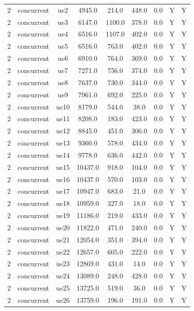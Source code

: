 \begin{table}[ht]
\begin{tabular}{|c|c|c|c|c|c|c|c|c|}
2 & concurrent & ue2 & 4945.0 & 214.0 & 448.0 & 0.0 & Y & Y \\
2 & concurrent & ue3 & 6147.0 & 1100.0 & 378.0 & 0.0 & Y & Y \\
2 & concurrent & ue4 & 6516.0 & 1107.0 & 402.0 & 0.0 & Y & Y \\
2 & concurrent & ue5 & 6516.0 & 763.0 & 402.0 & 0.0 & Y & Y \\
2 & concurrent & ue6 & 6910.0 & 764.0 & 369.0 & 0.0 & Y & Y \\
2 & concurrent & ue7 & 7271.0 & 756.0 & 374.0 & 0.0 & Y & Y \\
2 & concurrent & ue8 & 7637.0 & 730.0 & 344.0 & 0.0 & Y & Y \\
2 & concurrent & ue9 & 7961.0 & 692.0 & 225.0 & 0.0 & Y & Y \\
2 & concurrent & ue10 & 8179.0 & 544.0 & 38.0 & 0.0 & Y & Y \\
2 & concurrent & ue11 & 8208.0 & 183.0 & 423.0 & 0.0 & Y & Y \\
2 & concurrent & ue12 & 8845.0 & 451.0 & 306.0 & 0.0 & Y & Y \\
2 & concurrent & ue13 & 9360.0 & 578.0 & 434.0 & 0.0 & Y & Y \\
2 & concurrent & ue14 & 9778.0 & 636.0 & 442.0 & 0.0 & Y & Y \\
2 & concurrent & ue15 & 10437.0 & 918.0 & 104.0 & 0.0 & Y & Y \\
2 & concurrent & ue16 & 10437.0 & 570.0 & 103.0 & 0.0 & Y & Y \\
2 & concurrent & ue17 & 10947.0 & 683.0 & 21.0 & 0.0 & Y & Y \\
2 & concurrent & ue18 & 10959.0 & 327.0 & 18.0 & 0.0 & Y & Y \\
2 & concurrent & ue19 & 11186.0 & 219.0 & 433.0 & 0.0 & Y & Y \\
2 & concurrent & ue20 & 11822.0 & 471.0 & 240.0 & 0.0 & Y & Y \\
2 & concurrent & ue21 & 12054.0 & 351.0 & 394.0 & 0.0 & Y & Y \\
2 & concurrent & ue22 & 12657.0 & 605.0 & 222.0 & 0.0 & Y & Y \\
2 & concurrent & ue23 & 12869.0 & 431.0 & 14.0 & 0.0 & Y & Y \\
2 & concurrent & ue24 & 13089.0 & 248.0 & 428.0 & 0.0 & Y & Y \\
2 & concurrent & ue25 & 13725.0 & 519.0 & 36.0 & 0.0 & Y & Y \\
2 & concurrent & ue26 & 13759.0 & 196.0 & 191.0 & 0.0 & Y & Y \\

\end{tabular}
\end{table}
